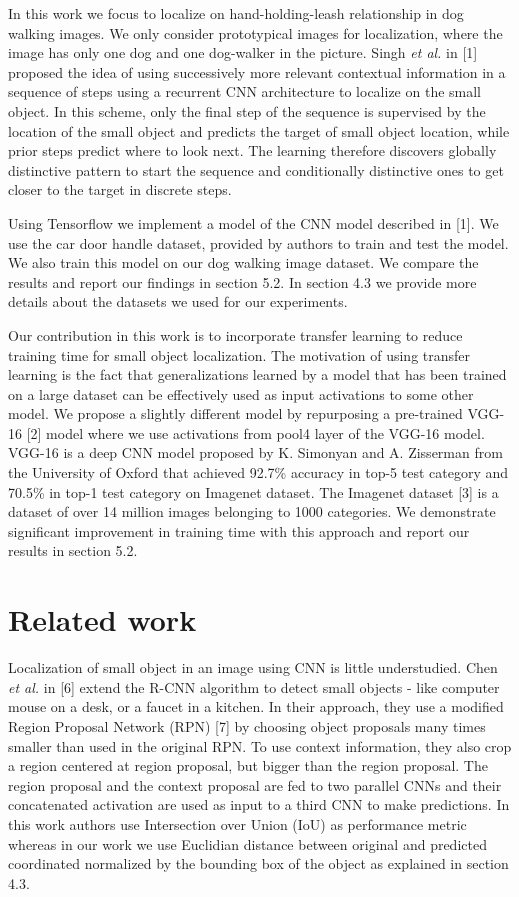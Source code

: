 \documentclass [11pt,letterpaper ,twoside ,openany ]{report}
\begin{document}
    In this work we focus to localize on hand-holding-leash relationship in dog walking images. We only consider prototypical images for localization, where the image has only one dog and one dog-walker in the picture. Singh \textit{et al.} in [1] proposed the idea of using successively more relevant contextual information in a sequence of steps using a recurrent CNN architecture to localize on the small object. In this scheme, only the final step of the sequence is supervised by the location of the small object and predicts the target of small object location, while prior steps predict where to look next. The learning therefore discovers globally distinctive pattern to start the sequence and conditionally distinctive ones to get closer to the target in discrete steps.

    Using Tensorflow\textsuperscript{\textregistered} we implement a model of the CNN model described in [1]. We use the car door handle dataset, provided by authors to train and test the model. We also train this model on our dog walking image dataset. We compare the results and report our findings in section 5.2. In section 4.3 we provide more details about the datasets we used for our experiments.

    Our contribution in this work is to incorporate transfer learning to reduce training time for small object localization. The motivation of using transfer learning is the fact that generalizations learned by a model that has been trained on a large dataset can be effectively used as input activations to some other model. We propose a slightly different model by repurposing a pre-trained VGG-16 [2] model where we use activations from pool4 layer of the VGG-16 model. VGG-16 is a deep CNN model proposed by K. Simonyan and A. Zisserman from the University of Oxford that achieved 92.7\% accuracy in top-5 test category and 70.5\% in top-1 test category on Imagenet dataset. The Imagenet dataset [3] is a dataset of over 14 million images belonging to 1000 categories. We demonstrate significant improvement in training time with this approach and report our results in section 5.2.

    \chapter{Related work}
    \doublespacing
    Localization of small object in an image using CNN is little understudied. Chen \textit{et al.} in [6] extend the R-CNN algorithm to detect small objects - like  computer mouse on a desk, or a faucet in a kitchen. In their approach, they use a modified Region Proposal Network (RPN) [7] by choosing object proposals many times smaller than used in the original RPN. To use context information, they also crop a region centered at region proposal, but bigger than the region proposal. The region proposal and the context proposal are fed to two parallel CNNs and their concatenated activation are used as input to a third CNN to make predictions. In this work authors use Intersection over Union (IoU) as performance metric whereas in our work we use Euclidian distance between original and predicted coordinated normalized by the bounding box of the object as explained in section 4.3. 
\end{document}
